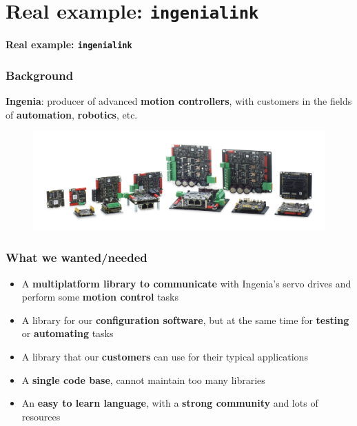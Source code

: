 \documentclass[handout]{beamer}
\begin{document}
\section{Real example: \texttt{ingenialink}}

\begin{frame}[plain]{}
  \begin{center}
    \Huge \textbf{Real example: \texttt{ingenialink}}
  \end{center}
\end{frame}

\begin{frame}
  \frametitle{Background}

  \textbf{Ingenia}: producer of advanced \textbf{motion controllers}, with
  customers in the fields of \textbf{automation}, \textbf{robotics}, etc.

  \begin{figure}
    \centering
    \includegraphics[width=\textwidth]{ingenia-servos.png}
  \end{figure}
\end{frame}

\begin{frame}
  \frametitle{What we wanted/needed}

  \begin{itemize}
    \item<1-> A \textbf{multiplatform library to communicate} with Ingenia's
      servo drives and perform some \textbf{motion control} tasks
    \item<2-> A library for our \textbf{configuration software}, but at the same
      time for \textbf{testing} or \textbf{automating} tasks
    \item<3-> A library that our \textbf{customers} can use for their typical
      applications
    \item<4-> A \textbf{single code base}, cannot maintain too many libraries
    \item<5-> An \textbf{easy to learn language}, with a \textbf{strong
      community} and lots of resources
  \end{itemize}
\end{frame}
\end{document}
